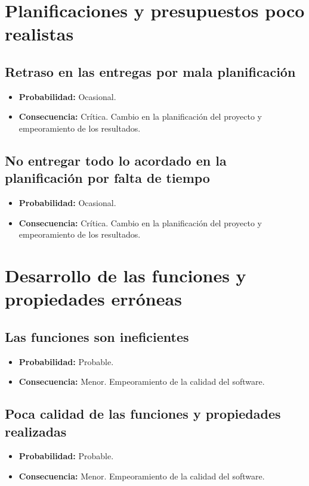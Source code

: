 \documentclass[spanish,a4paper,11pt, twoside]{report}	%
\begin{document}
%
\section{Planificaciones y presupuestos poco realistas}

	\subsection*{Retraso en las entregas por mala planificación}
		\begin{itemize}
			\item \textbf {Probabilidad: }Ocasional.
			\item \textbf {Consecuencia: }Crítica. Cambio en la planificación del proyecto y empeoramiento de los resultados.
		\end{itemize}
	
	\subsection*{No entregar todo lo acordado en la planificación por falta de tiempo}
		\begin{itemize}
			\item \textbf {Probabilidad: }Ocasional.
			\item \textbf {Consecuencia: }Crítica. Cambio en la planificación del proyecto y empeoramiento de los resultados.
		\end{itemize}

%
\section{Desarrollo de las funciones y propiedades erróneas}

	\subsection*{Las funciones son ineficientes}
		\begin{itemize}
			\item \textbf {Probabilidad: }Probable.
			\item \textbf {Consecuencia: }Menor. Empeoramiento de la calidad del software.
		\end{itemize}
	
	\subsection*{Poca calidad de las funciones y propiedades realizadas}
		\begin{itemize}
			\item \textbf {Probabilidad: }Probable.
			\item \textbf {Consecuencia: }Menor. Empeoramiento de la calidad del software.
		\end{itemize}
	
\end{document}
